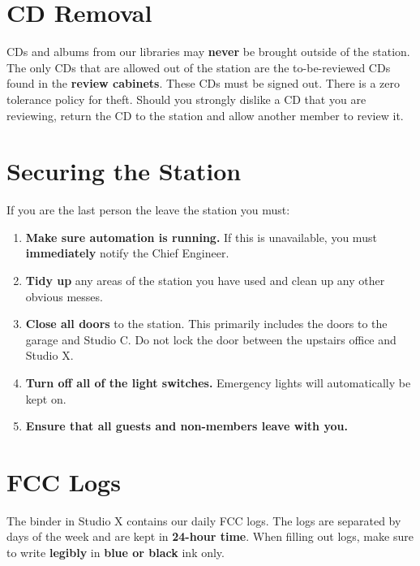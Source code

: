 \documentclass{witrman}
\begin{document}
\section{CD Removal}
CDs and albums from our libraries may \textbf{never} be brought outside of the
station.  The only CDs that are allowed out of the station are the
to-be-reviewed CDs found in the \textbf{review cabinets}. These CDs must be
signed out.  There is a zero tolerance policy for theft. Should you strongly
dislike a CD that you are reviewing, return the CD to the station and allow
another member to review it.

\section{Securing the Station}
If you are the last person the leave the station you must:
\begin{enumerate}
    \item \textbf{Make sure automation is running.} If this is unavailable, you
        must \textbf{immediately} notify the Chief Engineer.
    \item \textbf{Tidy up} any areas of the station you have used and clean up
        any other obvious messes.
    \item \textbf{Close all doors} to the station. This primarily includes the
        doors to the garage and Studio C. Do not lock the door between the
        upstairs office and Studio X.
    \item \textbf{Turn off all of the light switches.} Emergency lights will
        automatically be kept on.
    \item \textbf{Ensure that all guests and non-members leave with you.}
\end{enumerate}

\section{FCC Logs}
The binder in Studio X contains our daily FCC logs. The logs are separated by
days of the week and are kept in \textbf{24-hour time}. When filling out logs,
make sure to write \textbf{legibly} in \textbf{blue or black} ink only.
\end{document}
